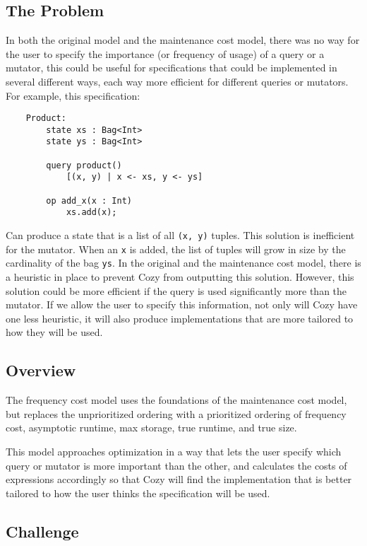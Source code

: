 \newcommand{\code}[1]{\texttt{#1}}

\subsection{The Problem}
In both the original model and the maintenance cost model, there was no way for
the user to specify the importance (or frequency of usage) of a query or a
mutator, this could be useful for specifications that could be implemented in
several different ways, each way more efficient for different queries or
mutators. For example, this specification:

\begin{lstlisting}
    Product:
        state xs : Bag<Int>
        state ys : Bag<Int>

        query product()
            [(x, y) | x <- xs, y <- ys]

        op add_x(x : Int)
            xs.add(x);
\end{lstlisting}

Can produce a state that is a list of all \code{(x, y)} tuples. This solution is
inefficient for the mutator. When an \code{x} is added, the list of tuples will
grow in size by the cardinality of the bag \code{ys}. In the original and the
maintenance cost model, there is a heuristic in place to prevent Cozy from
outputting this solution. However, this solution could be more efficient if the
query is used significantly more than the mutator. If we allow the user to
specify this information, not only will Cozy have one less heuristic, it will
also produce implementations that are more tailored to how they will be used.

\subsection{Overview}
The frequency cost model uses the foundations of the maintenance cost model, but
replaces the unprioritized ordering with a prioritized ordering of frequency
cost, asymptotic runtime, max storage, true runtime, and true size.

This model approaches optimization in a way that lets the user specify which
query or mutator is more important than the other, and calculates the costs of
expressions accordingly so that Cozy will find the implementation that is better
tailored to how the user thinks the specification will be used.

\subsection{Challenge}

